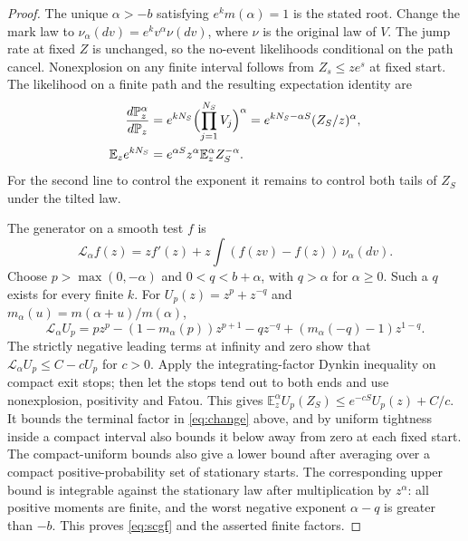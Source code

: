 \documentclass[10pt]{article}
\newcommand{\E}{\mathbb E}
\newcommand{\Pp}{\mathbb P}
\begin{document}
\begin{proof}
The unique $\alpha>-b$ satisfying $e^k m(\alpha)=1$ is the stated root. Change the mark law to $\nu_{\alpha}(dv)=e^k v^\alpha\nu(dv)$, where $\nu$ is the original law of $V$. The jump rate at fixed $Z$ is unchanged, so the no-event likelihoods conditional on the path cancel. Nonexplosion on any finite interval follows from $Z_s\le z e^s$ at fixed start. The likelihood on a finite path and the resulting expectation identity are
\begin{align}
\frac{d\Pp_z^\alpha}{d\Pp_z}&=
e^{kN_S}\Bigl(\prod_{j=1}^{N_S}V_j\Bigr)^\alpha
=e^{kN_S-\alpha S}(Z_S/z)^\alpha,\\
\E_z e^{kN_S}&=e^{\alpha S}z^\alpha\E_z^\alpha Z_S^{-\alpha}.
\label{eq:change}
\end{align}
For the second line to control the exponent it remains to control both tails of $Z_S$ under the tilted law.

The generator on a smooth test $f$ is
\[
\mathcal L_\alpha f(z)=zf'(z)+z\int (f(zv)-f(z))\,\nu_\alpha(dv).
\]
Choose $p>\max(0,-\alpha)$ and $0<q<b+\alpha$, with $q>\alpha$ for $\alpha\ge0$. Such a $q$ exists for every finite $k$. For $U_p(z)= z^p+z^{-q}$ and $m_\alpha(u)=m(\alpha+u)/m(\alpha)$,
\[
\mathcal L_\alpha U_p=pz^p-(1-m_\alpha(p))z^{p+1}
-qz^{-q}+(m_\alpha(-q)-1)z^{1-q}.
\]
The strictly negative leading terms at infinity and zero show that $\mathcal L_\alpha U_p\le C-cU_p$ for $c>0$. Apply the integrating-factor Dynkin inequality on compact exit stops; then let the stops tend out to both ends and use nonexplosion, positivity and Fatou. This gives $\E_z^\alpha U_p(Z_S)\le e^{-cS}U_p(z)+C/c$. It bounds the terminal factor in \eqref{eq:change} above, and by uniform tightness inside a compact interval also bounds it below away from zero at each fixed start. The compact-uniform bounds also give a lower bound after averaging over a compact positive-probability set of stationary starts. The corresponding upper bound is integrable against the stationary law after multiplication by $z^\alpha$: all positive moments are finite, and the worst negative exponent $\alpha-q$ is greater than $-b$. This proves \eqref{eq:scgf} and the asserted finite factors.
\end{proof}
\end{document}
